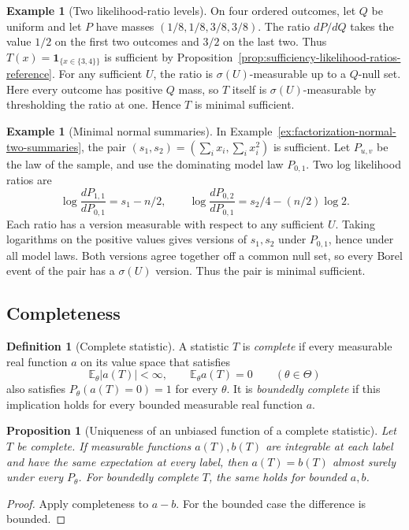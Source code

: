 \documentclass[11pt,oneside]{book}
\newtheorem{proposition}[theorem]{Proposition}
\theoremstyle{definition}
\newtheorem{definition}[theorem]{Definition}
\newtheorem{example}[theorem]{Example}
\theoremstyle{remark}
\begin{document}
\begin{example}[Two likelihood-ratio levels]
\label{ex:minimal-sufficient-finite-cells}
On four ordered outcomes, let $Q$ be uniform and let $P$ have
masses $(1/8,1/8,3/8,3/8)$. The ratio $dP/dQ$ takes the value
$1/2$ on the first two outcomes and $3/2$ on the last two.
Thus $T(x)=\mathbf 1_{\{x\in\{3,4\}\}}$ is sufficient by
Proposition~\ref{prop:sufficiency-likelihood-ratios-reference}.
For any sufficient $U$, the ratio is $\sigma(U)$-measurable up
to a $Q$-null set. Here every outcome has positive $Q$ mass, so
$T$ itself is $\sigma(U)$-measurable by thresholding the ratio
at one. Hence $T$ is minimal sufficient.
\end{example}

\begin{example}[Minimal normal summaries]
\label{ex:minimal-sufficient-normal-summaries}
In Example~\ref{ex:factorization-normal-two-summaries},
the pair $(s_1,s_2)=(\sum_i x_i,\sum_i x_i^2)$ is sufficient.
Let $P_{u,v}$ be the law of the sample, and use the dominating
model law $P_{0,1}$. Two log likelihood ratios are
\[
\log\frac{dP_{1,1}}{dP_{0,1}}=s_1-n/2,\qquad
\log\frac{dP_{0,2}}{dP_{0,1}}=s_2/4-(n/2)\log 2 .
\]
Each ratio has a version measurable with respect to any
sufficient $U$. Taking logarithms on the positive values gives
versions of $s_1,s_2$ under $P_{0,1}$, hence under all model laws.
Both versions agree together off a common null set, so every
Borel event of the pair has a $\sigma(U)$ version. Thus the
pair is minimal sufficient.
\end{example}

\subsection{Completeness}
\label{subsec:statistic-completeness}

\begin{definition}[Complete statistic]
\label{def:complete-statistic}
A statistic $T$ is \emph{complete} if every measurable real
function $a$ on its value space that satisfies
\[
\mathbb E_\theta |a(T)|<\infty,\qquad \mathbb E_\theta a(T)=0
\qquad(\theta\in\Theta)
\]
also satisfies $P_\theta(a(T)=0)=1$ for every $\theta$.
It is \emph{boundedly complete} if this implication holds for
every bounded measurable real function $a$.
\end{definition}

\begin{proposition}[Uniqueness of an unbiased function of a complete statistic]
\label{prop:complete-unbiased-uniqueness}
Let $T$ be complete. If measurable functions $a(T),b(T)$ are integrable
at each label and have the same expectation at every label, then
$a(T)=b(T)$ almost surely under every $P_\theta$.
For boundedly complete $T$, the same holds for bounded $a,b$.
\end{proposition}
\begin{proof}
Apply completeness to $a-b$. For the bounded case the difference
is bounded.
\end{proof}
\end{document}
